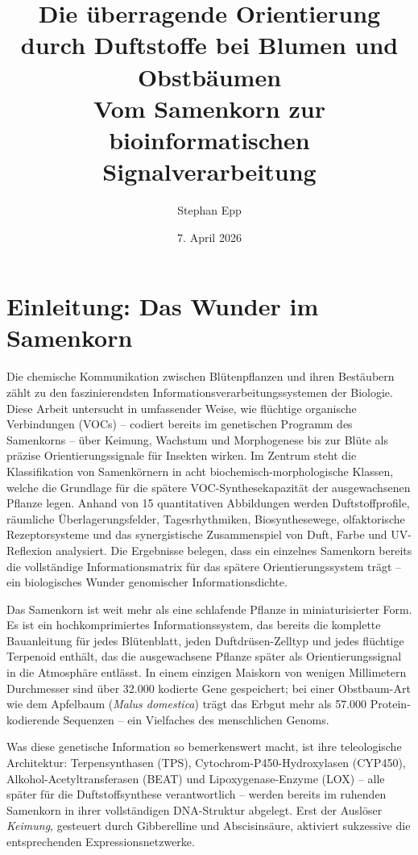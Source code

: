 \documentclass[12pt,a4paper]{article}
\title{{\bfseries Die \"uberragende Orientierung durch Duftstoffe
		bei Blumen und Obstb\"aumen\\[-0.1em]}
	{\Large	Vom Samenkorn zur bioinformatischen Signalverarbeitung}
}
\author{Stephan Epp}
\date{7. April 2026}
\begin{document}
\maketitle
\tableofcontents
\clearpage

\section{Einleitung: Das Wunder im Samenkorn}
Die chemische Kommunikation zwischen Bl\"utenpflanzen und ihren Best\"aubern z\"ahlt zu den faszinierendsten Informationsverarbeitungssystemen der Biologie. Diese Arbeit untersucht in umfassender Weise, wie fl\"uchtige organische Verbindungen (VOCs) -- codiert bereits im genetischen Programm des Samenkorns -- \"uber Keimung, Wachstum und Morphogenese bis zur Bl\"ute als pr\"azise Orientierungssignale f\"ur Insekten wirken. Im Zentrum steht die Klassifikation von Samenk\"ornern in acht biochemisch-morphologische Klassen, welche die Grundlage f\"ur die sp\"atere VOC-Synthesekapazit\"at der ausgewachsenen Pflanze legen. Anhand von 15 quantitativen Abbildungen werden Duftstoffprofile, r\"aumliche \"Uberlagerungsfelder, Tagesrhythmiken, Biosynthesewege, olfaktorische Rezeptorsysteme und das synergistische Zusammenspiel von Duft, Farbe und UV-Reflexion analysiert. Die Ergebnisse belegen, dass ein einzelnes Samenkorn bereits die vollst\"andige Informationsmatrix f\"ur das sp\"atere Orientierungssystem tr\"agt -- ein biologisches Wunder genomischer Informationsdichte.

Das Samenkorn ist weit mehr als eine schlafende Pflanze in miniaturisierter Form. Es ist ein hochkomprimiertes Informationssystem, das bereits die komplette Bauanleitung f\"ur jedes Bl\"utenblatt, jeden Duftdr\"usen-Zelltyp und jedes fl\"uchtige Terpenoid enth\"alt, das die ausgewachsene Pflanze sp\"ater als Orientierungssignal in die Atmosph\"are entl\"asst. In einem einzigen Maiskorn von wenigen Millimetern Durchmesser sind \"uber 32.000 kodierte Gene gespeichert; bei einer Obstbaum-Art wie dem Apfelbaum (\textit{Malus domestica}) tr\"agt das Erbgut mehr als 57.000 Protein-kodierende Sequenzen -- ein Vielfaches des menschlichen Genoms.

Was diese genetische Information so bemerkenswert macht, ist ihre teleologische Architektur: Terpensynthasen (TPS), Cytochrom-P450-Hydroxylasen (CYP450), Alkohol-Acetyltransferasen (BEAT) und Lipoxygenase-Enzyme (LOX) -- alle sp\"ater f\"ur die Duftstoffsynthese verantwortlich -- werden bereits im ruhenden Samenkorn in ihrer vollst\"andigen DNA-Struktur abgelegt. Erst der Ausl\"oser \emph{Keimung}, gesteuert durch Gibberelline und Abscisins\"aure, aktiviert sukzessive die entsprechenden Expressionsnetzwerke.
\end{document}
